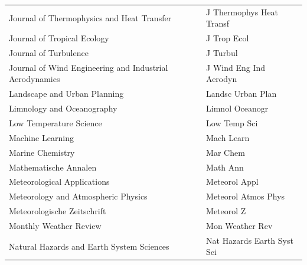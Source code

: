 \begin{longtable}{| p{8 cm} | p{6 cm} |}
Journal of Thermophysics and Heat Transfer & J Thermophys Heat Transf \\
Journal of Tropical Ecology & J Trop Ecol \\
Journal of Turbulence & J Turbul \\
Journal of Wind Engineering and Industrial Aerodynamics & J Wind Eng Ind Aerodyn \\
\hline
Landscape and Urban Planning & Landsc Urban Plan \\
Limnology and Oceanography & Limnol Oceanogr \\
Low Temperature Science & Low Temp Sci \\
\hline
Machine Learning & Mach Learn \\
Marine Chemistry & Mar Chem \\
Mathematische Annalen & Math Ann \\
Meteorological Applications & Meteorol Appl \\
Meteorology and Atmospheric Physics & Meteorol Atmos Phys \\
Meteorologische Zeitschrift & Meteorol Z \\
Monthly Weather Review & Mon Weather Rev \\
\hline
Natural Hazards and Earth System Sciences & Nat Hazards Earth Syst Sci \\
\hline
\end{longtable}

\pagebreak[4]

